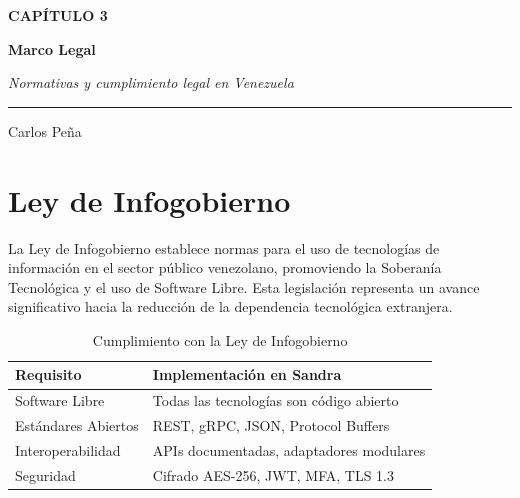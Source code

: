 \documentclass[11pt, spanish, letterpaper, twocolumn]{book}
\begin{document}
\thispagestyle{empty}
\null\vfill
\begin{center}
    
    {\fontsize{11}{13}\selectfont\color{sandraAccent}\bfseries\uppercase{Capítulo 3}\par}
    \vspace{0.8cm}
    {\fontsize{28}{34}\selectfont\bfseries\color{sandraDark}Marco Legal\par}
    \vspace{0.3cm}
    {\fontsize{12}{15}\selectfont\color{sandraText}\itshape Normativas y cumplimiento legal en Venezuela\par}
    \vspace{1cm}
    \rule{0.25\linewidth}{1pt}
    \vspace{0.5cm}
    {\fontsize{10}{12}\selectfont\color{sandraGray}Carlos Peña}
\end{center}
\vfill
\clearpage

\section{Ley de Infogobierno}

La Ley de Infogobierno establece normas para el uso de tecnologías de información en el sector público venezolano, promoviendo la Soberanía Tecnológica y el uso de Software Libre. Esta legislación representa un avance significativo hacia la reducción de la dependencia tecnológica extranjera.

\begin{table}[H]
    \centering
    \caption{Cumplimiento con la Ley de Infogobierno}
    \begin{tabular}{lp{5.5cm}}
        \toprule
        \textbf{Requisito} & \textbf{Implementación en Sandra} \\
        \midrule
        Software Libre & Todas las tecnologías son código abierto \\
        Estándares Abiertos & REST, gRPC, JSON, Protocol Buffers \\
        Interoperabilidad & APIs documentadas, adaptadores modulares \\
        Seguridad & Cifrado AES-256, JWT, MFA, TLS 1.3 \\
        \bottomrule
    \end{tabular}
    \label{tab:infogobierno}
\end{table}
\end{document}
